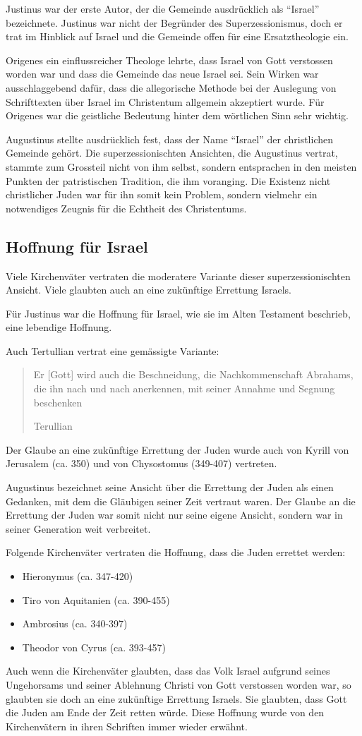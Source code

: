\documentclass{../../inc/mybib}
\newcommand{\sz}{Superzessionismus}
\begin{document}
    Justinus war der erste Autor, der die Gemeinde ausdrücklich als \enquote{Israel} bezeichnete. Justinus war nicht der Begründer des \sz, doch er trat im Hinblick auf Israel und die Gemeinde offen für eine Ersatztheologie ein.

    Origenes ein einflussreicher Theologe lehrte, dass Israel von Gott verstossen worden war und dass die Gemeinde das neue Israel sei. Sein Wirken war ausschlaggebend dafür, dass die allegorische Methode bei der Auslegung von Schrifttexten über Israel im Christentum allgemein akzeptiert wurde. Für Origenes war die geistliche Bedeutung hinter dem wörtlichen Sinn sehr wichtig.

    Augustinus stellte ausdrücklich fest, dass der Name \enquote{Israel} der christlichen Gemeinde gehört. Die superzessionischten Ansichten, die Augustinus vertrat, stammte zum Grossteil nicht von ihm selbst, sondern entsprachen in den meisten Punkten der patristischen Tradition, die ihm voranging. Die Existenz nicht christlicher Juden war für ihn somit kein Problem, sondern vielmehr ein notwendiges Zeugnis für die Echtheit des Christentums.

    \subsection{Hoffnung für Israel}
    Viele Kirchenväter vertraten die moderatere Variante dieser superzessionischten Ansicht. Viele glaubten auch an eine zukünftige Errettung Israels.

    Für Justinus war die Hoffnung für Israel, wie sie im Alten Testament beschrieb, eine lebendige Hoffnung.

    Auch Tertullian vertrat eine gemässigte Variante:
    \blockquote[Terullian]{Er [Gott] wird auch die Beschneidung, die Nachkommenschaft Abrahams, die ihn nach und nach anerkennen, mit seiner Annahme und Segnung beschenken}

    Der Glaube an eine zukünftige Errettung der Juden wurde auch von Kyrill von Jerusalem (ca. 350) und von Chysostomus (349-407) vertreten. 

    Augustinus bezeichnet seine Ansicht über die Errettung der Juden als einen Gedanken, mit dem die Gläubigen seiner Zeit vertraut waren. Der Glaube an die Errettung der Juden war somit nicht nur seine eigene Ansicht, sondern war in seiner Generation weit verbreitet.

    Folgende Kirchenväter vertraten die Hoffnung, dass die Juden errettet werden:
    \begin{itemize}
        \item Hieronymus (ca. 347-420)
        \item Tiro von Aquitanien (ca. 390-455)
        \item Ambrosius (ca. 340-397)
        \item Theodor von Cyrus (ca. 393-457)
    \end{itemize}
    Auch wenn die Kirchenväter glaubten, dass das Volk Israel aufgrund seines Ungehorsams und seiner Ablehnung Christi von Gott verstossen worden war, so glaubten sie doch an eine zukünftige Errettung Israels. Sie glaubten, dass Gott die Juden am Ende der Zeit retten würde. Diese Hoffnung wurde von den Kirchenvätern in ihren Schriften immer wieder erwähnt.
\end{document}
